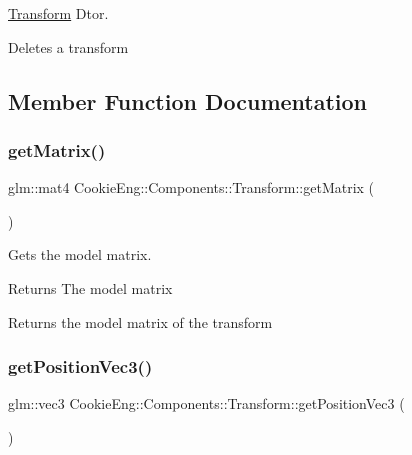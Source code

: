 \hyperlink{class_cookie_eng_1_1_components_1_1_transform}{Transform} Dtor. 

Deletes a transform 

\subsection{Member Function Documentation}
\mbox{\label{class_cookie_eng_1_1_components_1_1_transform_a0d18917e8701c84b6759823f785969de}} 
\subsubsection{\texorpdfstring{get\+Matrix()}{getMatrix()}}
{\footnotesize\ttfamily glm\+::mat4 Cookie\+Eng\+::\+Components\+::\+Transform\+::get\+Matrix (\begin{DoxyParamCaption}{ }\end{DoxyParamCaption})\hspace{0.3cm}{\ttfamily [inline]}}



Gets the model matrix. 

\begin{DoxyReturn}{Returns}
The model matrix
\end{DoxyReturn}
Returns the model matrix of the transform \mbox{\label{class_cookie_eng_1_1_components_1_1_transform_a20c33650a735e8c9c54b232e871ff526}} 
\subsubsection{\texorpdfstring{get\+Position\+Vec3()}{getPositionVec3()}}
{\footnotesize\ttfamily glm\+::vec3 Cookie\+Eng\+::\+Components\+::\+Transform\+::get\+Position\+Vec3 (\begin{DoxyParamCaption}{ }\end{DoxyParamCaption})\hspace{0.3cm}{\ttfamily [inline]}}



